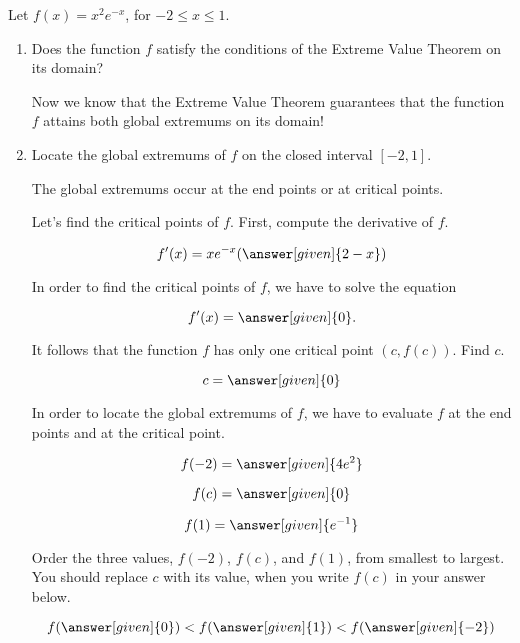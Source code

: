 \documentclass{ximera}
\begin{document}
\begin{question}%
Let $f(x)=x^2e^{-x}$, for $ -2\le x\le1$.
\begin{enumerate} 
\item Does the function $f$ satisfy
the conditions of the Extreme Value Theorem on its domain?
 \begin{multipleChoice}
 \end{multipleChoice}
Now we know that the Extreme Value Theorem guarantees that the function $f$
 attains both global extremums on its domain!
 \item Locate the global extremums
of $f$ on the closed interval $[-2,1]$.
\begin{explanation}

  The global extremums
 occur at the end points or at critical points.
  
Let's find the critical points of $f$. First, compute the derivative of $f$.
 \begin{prompt}
   \[
   f'(x)= xe^{-x}(\answer[given]{2-x})
   \]
 \end{prompt}
 In order to find the critical points of $f$, we have to solve the
 equation
 \begin{prompt}
   \[
   f'(x)= \answer[given]{0}.
   \]
 \end{prompt}
 It follows that the function $f$ has only one critical point
 $\left(c,f(c)\right)$. Find $c$.
 \begin{prompt}
   \[
   c= \answer[given]{0}
   \]
 \end{prompt}
 In order to locate the global extremums of $f$, we have to evaluate
 $f$ at the end points and at the critical point.
 \begin{prompt}
   \[
   f(-2)= \answer[given]{4e^{2}}
   \]
 \end{prompt}
 \begin{prompt}
   \[
   f(c)= \answer[given]{0}
   \]
 \end{prompt}
 
 \begin{prompt}
   \[
   f(1)= \answer[given]{e^{-1}}
   \]
 \end{prompt}
 Order the three values, $f(-2)$, $f(c)$, and $f(1)$,  from smallest to largest. You should replace $c$ with its value, when you write $f(c)$  in your answer below.
 \begin{prompt}
  \[
  f(\answer[given]{0})<f(\answer[given]{1})<f(\answer[given]{-2})
  \]
  

\end{prompt}
\end{explanation}
\end{enumerate}
\end{question}
\end{document}
